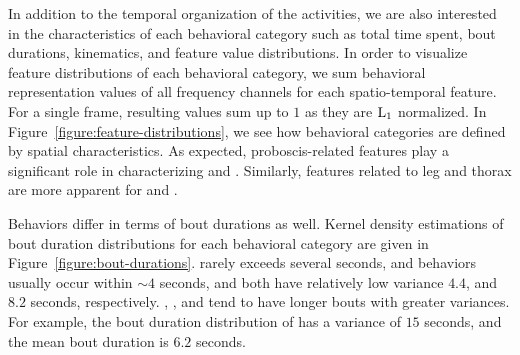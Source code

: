In addition to the temporal organization of the activities, we are also interested in the characteristics of each behavioral category such as total time spent, bout durations, kinematics, and feature value distributions.
In order to visualize feature distributions of each behavioral category, we sum behavioral representation values of all frequency channels for each spatio-temporal feature.
For a single frame, resulting values sum up to $1$ as they are $\textnormal{L}_1$ normalized.
In Figure~\ref{figure:feature-distributions}, we see how behavioral categories are defined by spatial characteristics.
As expected, proboscis-related features play a significant role in characterizing \Feeding and \ProboscisPumping.
Similarly, features related to leg and thorax are more apparent for \Grooming and \PosturalAdjustment.

Behaviors differ in terms of bout durations as well.
Kernel density estimations of bout duration distributions for each behavioral category are given in Figure~\ref{figure:bout-durations}.
\CHaltereSwitch rarely exceeds several seconds, and \PosturalAdjustment behaviors usually occur within ${\sim}4$ seconds, and both have relatively low variance $4.4$, and $8.2$ seconds, respectively.
\CFeeding, \ProboscisPumping, and \Grooming tend to have longer bouts with greater variances.
For example, the bout duration distribution of \Grooming has a variance of $15$ seconds, and the mean bout duration is $6.2$ seconds.

